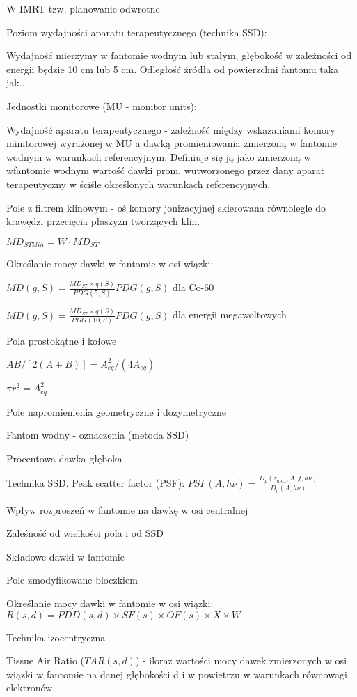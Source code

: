 \documentclass{article}
\begin{document}
W IMRT tzw. planowanie odwrotne

Poziom wydajności aparatu terapeutycznego (technika SSD):

Wydajność mierzymy w fantomie wodnym lub stałym, głębokość w zależności od energii będzie 10 cm lub 5 cm. Odległość źródła od powierzchni fantomu taka jak...

Jednostki monitorowe (MU - monitor units):

Wydajność aparatu terapeutycznego - zależność między wskazaniami komory minitorowej wyrażonej w MU a dawką promieniowania zmierzoną w fantomie wodnym w warunkach referencyjnym. Definiuje się ją jako zmierzoną w wfantomie wodnym wartość dawki prom. wutworzonego przez dany aparat terapeutyczny w ściśle określonych warunkach referencyjnych.

Pole z filtrem klinowym - oś komory jonizacyjnej skierowana równolegle do krawędzi przecięcia płaszyzn tworzących klin.

$MD_{STklin} = W \cdot MD_{ST}$

Określanie mocy dawki w fantomie w osi wiązki:

$MD(g,S) = \frac{MD_{ST}\times q(S)}{PDG(5,S)}PDG(g,S)$ dla Co-60

$MD(g,S) = \frac{MD_{ST}\times q(S)}{PDG(10,S)}PDG(g,S)$ dla energii megawoltowych

Pola prostokątne i kołowe

$AB/[2(A+B)] = A_{eq}^2/(4A_{eq})$

$\pi r^2 = A_{eq}^2$

Pole napromienienia geometryczne i dozymetryczne

Fantom wodny - oznaczenia (metoda SSD)

Procentowa dawka głęboka

Technika SSD. Peak scatter factor (PSF): $PSF(A,h\nu) = \frac{D_p(z_{max}, A, f, h\nu)}{D_p(A, h\nu)}$

Wpływ rozproszeń w fantomie na dawkę w osi centralnej

Zaleśność od wielkości pola i od SSD

Składowe dawki w fantomie

Pole zmodyfikowane bloczkiem

Określanie mocy dawki w fantomie w osi wiązki: $R(s,d) = PDD(s,d) \times SF(s) \times OF(s) \times X \times W$

Technika izocentryczna

Tissue Air Ratio ($TAR(s,d)$) - iloraz wartości mocy dawek zmierzonych w osi wiązki w fantomie na danej głębokości d i w powietrzu w warunkach równowagi elektronów.
\end{document}
